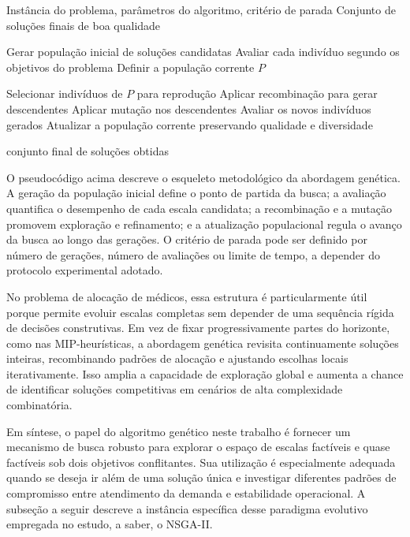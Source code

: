 \begin{algoritmo}
    \caption{Estrutura do algoritmo genético para alocação de médicos}
    \label{alg:ga-geral}
    \begin{algorithmic}[1]
        \Require Instância do problema, parâmetros do algoritmo, critério de parada
        \Ensure Conjunto de soluções finais de boa qualidade

        \State Gerar população inicial de soluções candidatas
        \State Avaliar cada indivíduo segundo os objetivos do problema
        \State Definir a população corrente $P$

        \State Selecionar indivíduos de $P$ para reprodução
        \State Aplicar recombinação para gerar descendentes
        \State Aplicar mutação nos descendentes
        \State Avaliar os novos indivíduos gerados
        \State Atualizar a população corrente preservando qualidade e diversidade
        \EndWhile

        \State \Return conjunto final de soluções obtidas
    \end{algorithmic}
\end{algoritmo}

O pseudocódigo acima descreve o esqueleto metodológico da abordagem genética. A geração da população inicial define o ponto de partida da busca; a avaliação quantifica o desempenho de cada escala candidata; a recombinação e a mutação promovem exploração e refinamento; e a atualização populacional regula o avanço da busca ao longo das gerações. O critério de parada pode ser definido por número de gerações, número de avaliações ou limite de tempo, a depender do protocolo experimental adotado.

No problema de alocação de médicos, essa estrutura é particularmente útil porque permite evoluir escalas completas sem depender de uma sequência rígida de decisões construtivas. Em vez de fixar progressivamente partes do horizonte, como nas MIP-heurísticas, a abordagem genética revisita continuamente soluções inteiras, recombinando padrões de alocação e ajustando escolhas locais iterativamente. Isso amplia a capacidade de exploração global e aumenta a chance de identificar soluções competitivas em cenários de alta complexidade combinatória.

Em síntese, o papel do algoritmo genético neste trabalho é fornecer um mecanismo de busca robusto para explorar o espaço de escalas factíveis e quase factíveis sob dois objetivos conflitantes. Sua utilização é especialmente adequada quando se deseja ir além de uma solução única e investigar diferentes padrões de compromisso entre atendimento da demanda e estabilidade operacional. A subseção a seguir descreve a instância específica desse paradigma evolutivo empregada no estudo, a saber, o NSGA-II.

